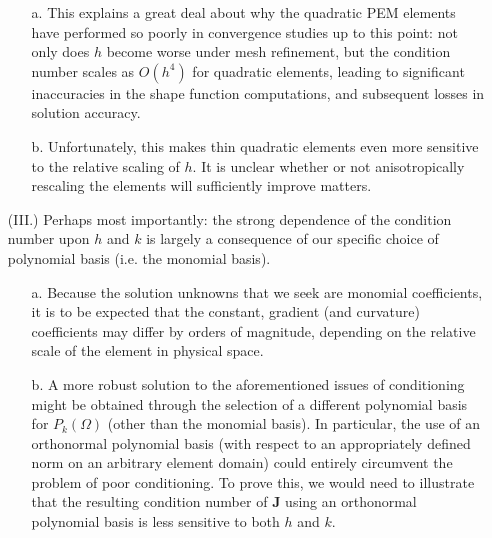 \begin{itemize}
	\begin{itemize}
		\item[a.] This explains a great deal about why the quadratic PEM elements have performed so poorly in convergence studies up to this point: not only does $h$ become worse under mesh refinement, but the condition number scales as $O(h^4)$ for quadratic elements, leading to significant inaccuracies in the shape function computations, and subsequent losses in solution accuracy.
		\item[b.] Unfortunately, this makes thin quadratic elements even more sensitive to the relative scaling of $h$. It is unclear whether or not anisotropically rescaling the elements will sufficiently improve matters.
	\end{itemize}
	\item[(III.)] Perhaps most importantly: the strong dependence of the condition number upon $h$ and $k$ is largely a consequence of our specific choice of polynomial basis (i.e. the monomial basis).
	\begin{itemize}
		\item[a.] Because the solution unknowns that we seek are monomial coefficients, it is to be expected that the constant, gradient (and curvature) coefficients may differ by orders of magnitude, depending on the relative scale of the element in physical space.
		\item[b.] A more robust solution to the aforementioned issues of conditioning might be obtained through the selection of a different polynomial basis for $P_k (\Omega)$ (other than the monomial basis). In particular, the use of an orthonormal polynomial basis (with respect to an appropriately defined norm on an arbitrary element domain) could entirely circumvent the problem of poor conditioning. To prove this, we would need to illustrate that the resulting condition number of $\mathbf{J}$ using an orthonormal polynomial basis is less sensitive to both $h$ and $k$.
	\end{itemize}
\end{itemize}